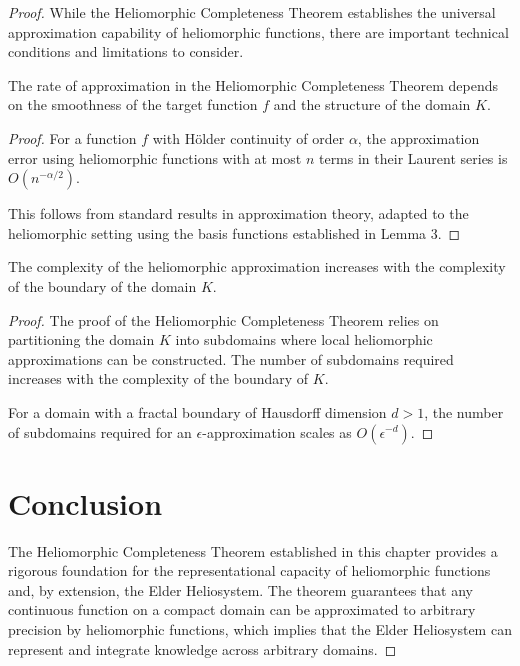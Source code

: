 \begin{proof}
While the Heliomorphic Completeness Theorem establishes the universal approximation capability of heliomorphic functions, there are important technical conditions and limitations to consider.

\begin{proposition}
The rate of approximation in the Heliomorphic Completeness Theorem depends on the smoothness of the target function $f$ and the structure of the domain $K$.
\end{proposition}

\begin{proof}
For a function $f$ with Hölder continuity of order $\alpha$, the approximation error using heliomorphic functions with at most $n$ terms in their Laurent series is $O(n^{-\alpha/2})$.

This follows from standard results in approximation theory, adapted to the heliomorphic setting using the basis functions established in Lemma 3.
\end{proof}

\begin{proposition}
The complexity of the heliomorphic approximation increases with the complexity of the boundary of the domain $K$.
\end{proposition}

\begin{proof}
The proof of the Heliomorphic Completeness Theorem relies on partitioning the domain $K$ into subdomains where local heliomorphic approximations can be constructed. The number of subdomains required increases with the complexity of the boundary of $K$.

For a domain with a fractal boundary of Hausdorff dimension $d > 1$, the number of subdomains required for an $\epsilon$-approximation scales as $O(\epsilon^{-d})$.
\end{proof}

\section{Conclusion}

The Heliomorphic Completeness Theorem established in this chapter provides a rigorous foundation for the representational capacity of heliomorphic functions and, by extension, the Elder Heliosystem. The theorem guarantees that any continuous function on a compact domain can be approximated to arbitrary precision by heliomorphic functions, which implies that the Elder Heliosystem can represent and integrate knowledge across arbitrary domains.


\end{proof}
